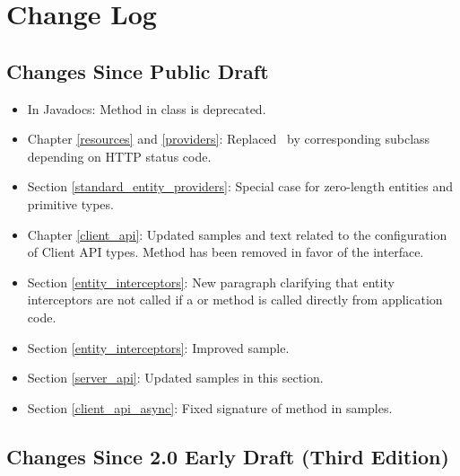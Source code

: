\chapter{Change Log}

\section{Changes Since Public Draft}

\begin{itemize}
\item In Javadocs: Method  in class  is deprecated.
\item Chapter \ref{resources} and \ref{providers}: Replaced \WebAppExc\ by corresponding subclass depending on HTTP status code. 
\item Section \ref{standard_entity_providers}: Special case for zero-length entities and primitive types.
\item Chapter \ref{client_api}: Updated samples and text related to the configuration of Client API types. Method  has been removed in favor of the  interface.
\item Section \ref{entity_interceptors}: New paragraph clarifying that entity interceptors are not called if a  or  method is called directly from application code.
\item Section \ref{entity_interceptors}: Improved  sample.
\item Section \ref{server_api}: Updated samples in this section.
\item Section \ref{client_api_async}: Fixed signature of method  in samples.

\end{itemize}

\section{Changes Since 2.0 Early Draft (Third Edition)}

